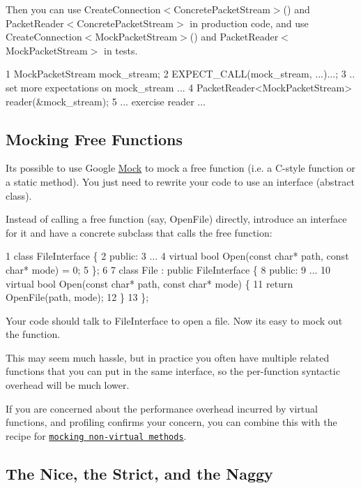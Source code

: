 Then you can use {\ttfamily Create\+Connection$<$Concrete\+Packet\+Stream$>$()} and {\ttfamily Packet\+Reader$<$Concrete\+Packet\+Stream$>$} in production code, and use {\ttfamily Create\+Connection$<$Mock\+Packet\+Stream$>$()} and {\ttfamily Packet\+Reader$<$Mock\+Packet\+Stream$>$} in tests.


\begin{DoxyCode}
1 MockPacketStream mock\_stream;
2 EXPECT\_CALL(mock\_stream, ...)...;
3 .. set more expectations on mock\_stream ...
4 PacketReader<MockPacketStream> reader(&mock\_stream);
5 ... exercise reader ...
\end{DoxyCode}


\subsection*{Mocking Free Functions}

It\textquotesingle{}s possible to use Google \hyperlink{class_mock}{Mock} to mock a free function (i.\+e. a C-\/style function or a static method). You just need to rewrite your code to use an interface (abstract class).

Instead of calling a free function (say, {\ttfamily Open\+File}) directly, introduce an interface for it and have a concrete subclass that calls the free function\+:


\begin{DoxyCode}
1 class FileInterface \{
2  public:
3   ...
4   virtual bool Open(const char* path, const char* mode) = 0;
5 \};
6 
7 class File : public FileInterface \{
8  public:
9   ...
10   virtual bool Open(const char* path, const char* mode) \{
11     return OpenFile(path, mode);
12   \}
13 \};
\end{DoxyCode}


Your code should talk to {\ttfamily File\+Interface} to open a file. Now it\textquotesingle{}s easy to mock out the function.

This may seem much hassle, but in practice you often have multiple related functions that you can put in the same interface, so the per-\/function syntactic overhead will be much lower.

If you are concerned about the performance overhead incurred by virtual functions, and profiling confirms your concern, you can combine this with the recipe for \href{#mocking-nonvirtual-methods}{\tt mocking non-\/virtual methods}.

\subsection*{The Nice, the Strict, and the Naggy}


